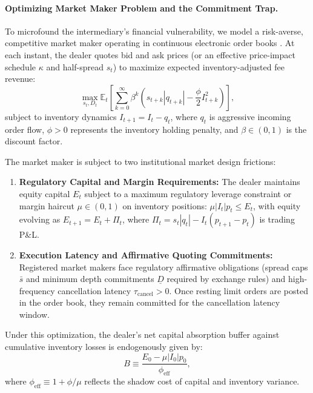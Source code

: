 \documentclass[12pt]{article}
\theoremstyle{definition}
\theoremstyle{remark}
\begin{document}
\paragraph{Optimizing Market Maker Problem and the Commitment Trap.}
To microfound the intermediary's financial vulnerability, we model a risk-averse, competitive market maker operating in continuous electronic order books \citep{ho1981optimal,grossman1988liquidity,avellaneda2008high,menkveld2013}. At each instant, the dealer quotes bid and ask prices (or an effective price-impact schedule $\kappa$ and half-spread $s_t$) to maximize expected inventory-adjusted fee revenue:
\begin{equation}
\max_{s_t, D_t} \mathbb{E}_t \left[ \sum_{k=0}^\infty \beta^k \left( s_{t+k} |q_{t+k}| - \frac{\phi}{2} I_{t+k}^2 \right) \right],
\label{eq:dealer_optimization}
\end{equation}
subject to inventory dynamics $I_{t+1} = I_t - q_t$, where $q_t$ is aggressive incoming order flow, $\phi > 0$ represents the inventory holding penalty, and $\beta \in (0, 1)$ is the discount factor. 

The market maker is subject to two institutional market design frictions:
\begin{enumerate}
    \item \textbf{Regulatory Capital and Margin Requirements:} The dealer maintains equity capital $E_t$ subject to a maximum regulatory leverage constraint or margin haircut $\mu \in (0, 1)$ on inventory positions: $\mu |I_t| p_t \le E_t$, with equity evolving as $E_{t+1} = E_t + \Pi_t$, where $\Pi_t = s_t |q_t| - I_t (p_{t+1} - p_t)$ is trading P\&L.
    \item \textbf{Execution Latency and Affirmative Quoting Commitments:} Registered market makers face regulatory affirmative obligations (spread caps $\bar{s}$ and minimum depth commitments $\underline{D}$ required by exchange rules) and high-frequency cancellation latency $\tau_{\text{cancel}} > 0$. Once resting limit orders are posted in the order book, they remain committed for the cancellation latency window.
\end{enumerate}

Under this optimization, the dealer's net capital absorption buffer against cumulative inventory losses is endogenously given by:
\begin{equation}
B \equiv \frac{E_0 - \mu |I_0| p_0}{\phi_{\text{eff}}},
\label{eq:dealer_buffer}
\end{equation}
where $\phi_{\text{eff}} \equiv 1 + \phi / \mu$ reflects the shadow cost of capital and inventory variance.
\end{document}
